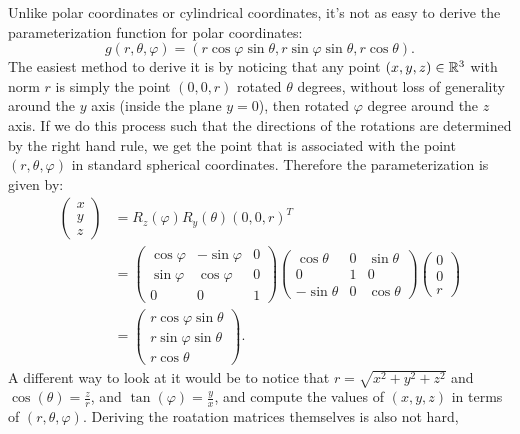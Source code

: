 \documentclass[11pt,a4paper]{article}
\begin{document}
\begin{remark}
  Unlike polar coordinates or cylindrical coordinates,
  it's not as easy to derive the parameterization function
  for polar coordinates:
  \[
    g(r,\theta,\varphi) =
    (r \cos \varphi \sin \theta, r \sin \varphi \sin \theta, r \cos \theta).
  \]
  The easiest method to derive it is by noticing that any point
  $(x,y,z) \in \mathbb{R}^3$ with norm $r$
  is simply the point $(0,0,r)$ rotated $\theta$ degrees,
  without loss of generality around the $y$ axis (inside
  the plane $y = 0$), then rotated $\varphi$ degree around the $z$ axis.
  If we do this process such that the directions
  of the rotations are determined by the right hand rule,
  we get the point that is associated with the point
  $(r,\theta,\varphi)$ in standard spherical coordinates.
  Therefore the parameterization is given by:
  \begin{align*}
    \begin{pmatrix}
      x \\ y \\ z
    \end{pmatrix} &=
    R_{z}(\varphi) R_{y}(\theta) (0,0,r)^T \\ &=
    \begin{pmatrix}
      \cos\varphi & -\sin\varphi & 0 \\
      \sin\varphi & \cos\varphi & 0 \\
      0 & 0 & 1
    \end{pmatrix}
    \begin{pmatrix}
      \cos\theta & 0 & \sin\theta \\
      0 & 1 & 0 \\
      -\sin\theta & 0 & \cos\theta
    \end{pmatrix}
    \begin{pmatrix}
      0 \\ 0 \\ r
    \end{pmatrix} \\ &=
    \begin{pmatrix}
      r \cos \varphi \sin \theta \\ r \sin \varphi \sin \theta \\ r \cos \theta
    \end{pmatrix}.
  \end{align*}
  A different way to look at it
  would be to notice that
  $r = \sqrt{x^2 + y^2 + z^2}$ and $\cos(\theta) = \frac{z}{r}$,
  and $\tan(\varphi) = \frac{y}{x}$,
  and compute the values of $(x,y,z)$ in terms of $(r,\theta,\varphi)$.
  Deriving the roatation matrices themselves is also not hard,
\end{remark}
\end{document}
